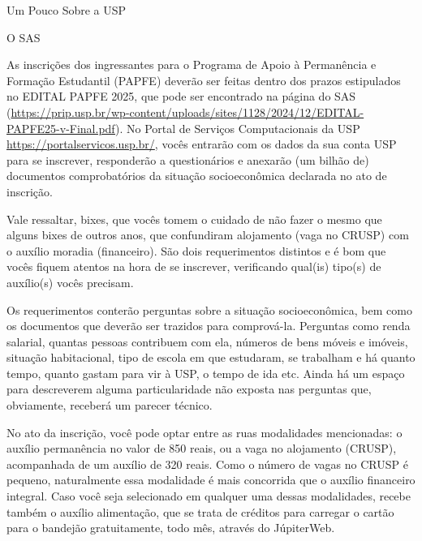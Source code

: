 \begin{secao}{Um Pouco Sobre a USP}
\begin{subsecao}{O SAS}


As inscrições dos ingressantes para o Programa de Apoio à Permanência e Formação Estudantil (PAPFE)
deverão ser feitas dentro dos prazos estipulados no EDITAL PAPFE 2025, que pode 
ser encontrado na página do SAS (\url{https://prip.usp.br/wp-content/uploads/sites/1128/2024/12/EDITAL-PAPFE25-v-Final.pdf}).
No Portal de Serviços Computacionais da USP \url{https://portalservicos.usp.br/}, vocês entrarão 
com os dados da sua conta USP para se inscrever, responderão a questionários e anexarão (um bilhão de) 
documentos comprobatórios da situação socioeconômica declarada no ato de inscrição.

Vale ressaltar, bixes, que vocês tomem o cuidado de não fazer o mesmo que alguns
bixes de outros anos, que confundiram alojamento (vaga no CRUSP) com o auxílio moradia (financeiro). São dois
requerimentos distintos e é bom que vocês fiquem atentos na hora de se inscrever, verificando
qual(is) tipo(s) de auxílio(s) vocês precisam.

Os requerimentos conterão perguntas sobre a situação socioeconômica, bem como os
documentos que deverão ser trazidos para comprová-la. Perguntas como renda
salarial, quantas pessoas contribuem com ela, números de bens móveis e imóveis,
situação habitacional, tipo de escola em que estudaram, se trabalham e há quanto
tempo, quanto gastam para vir à USP, o tempo de ida etc. Ainda há um espaço
para descreverem alguma particularidade não exposta nas perguntas que, obviamente,
receberá um parecer técnico.

No ato da inscrição, você pode optar entre as ruas modalidades mencionadas: o auxílio permanência
no valor de 850 reais, ou a vaga no alojamento (CRUSP), acompanhada de um auxílio de 320 reais. Como 
o número de vagas no CRUSP é pequeno, naturalmente essa modalidade é mais concorrida que o auxílio financeiro integral.
Caso você seja selecionado em qualquer uma dessas modalidades, recebe também o auxílio alimentação, que se trata de créditos
para carregar o cartão para o bandejão gratuitamente, todo mês, através do JúpiterWeb.


\end{subsecao}
\end{secao}
